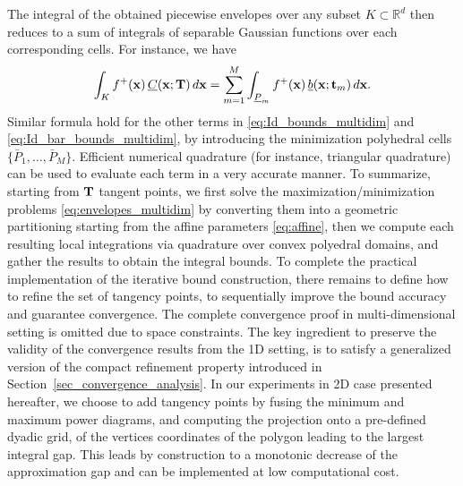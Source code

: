 \documentclass[review]{elsarticle}
\def\x{{\bf x}}
\def\t{{\bf t}}
\def\T{{\bf T}}
\begin{document}
{The integral of the obtained piecewise envelopes over any subset $K \subset \mathbb{R}^d$ then reduces to a sum of integrals of separable Gaussian functions over each corresponding cells. For instance, we have
\begin{equation}
\int_K f^+(\x)\,\underline{C}(\x;\T)\,d\x
=
\sum_{m=1}^M
\int_{\underline{P}_m} f^+(\x)\,\underline{b}(\x;\t_m)\,d\x.
\end{equation}
Similar formula hold for the other terms in \eqref{eq:Id_bounds_multidim} and \eqref{eq:Id_bar_bounds_multidim}, by introducing the minimization polyhedral cells $\{\bar{P}_1,\ldots,\bar{P}_M\}$. Efficient numerical quadrature (for instance, triangular quadrature) can be used to evaluate each term in a very accurate manner. To summarize, starting from $\T$ tangent points, we first solve the maximization/minimization problems \eqref{eq:envelopes_multidim} by converting them into a geometric partitioning starting from the affine parameters \eqref{eq:affine}, then we compute each resulting local integrations via quadrature over convex polyedral domains, and gather the results to obtain the integral bounds. To complete the practical implementation of the iterative bound construction, there remains to define how to refine the set of tangency points, to sequentially improve the bound accuracy and guarantee convergence. The complete convergence proof in multi-dimensional setting is omitted due to space constraints. The key ingredient to preserve the validity of the convergence results from the 1D setting, is to satisfy a generalized version of the compact refinement property introduced in Section~\ref{sec_convergence_analysis}. In our experiments in 2D case presented hereafter, we choose to add tangency points by fusing the minimum and maximum power diagrams, and computing the projection onto a pre-defined dyadic grid, of the vertices coordinates of the polygon leading to the largest integral gap. This leads by construction to a monotonic decrease of the approximation gap and can be implemented at low computational cost.
}
\end{document}
